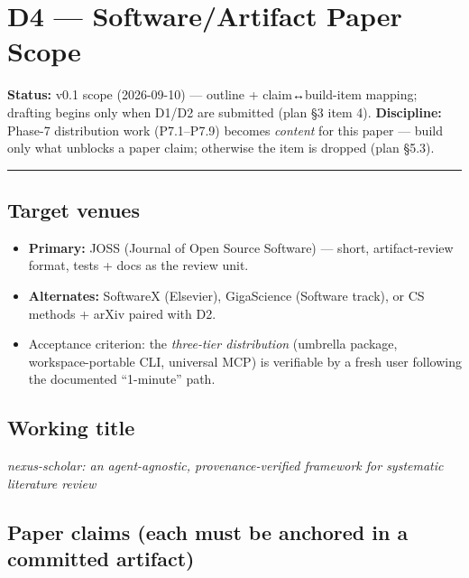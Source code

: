 \documentclass[11pt]{article}
\providecommand{\tightlist}{%
  \setlength{\itemsep}{0pt}\setlength{\parskip}{0pt}}
\begin{document}
\section{D4 --- Software/Artifact Paper
Scope}\label{d4-softwareartifact-paper-scope}

\textbf{Status:} v0.1 scope (2026-09-10) --- outline + claim↔build-item
mapping; drafting begins only when D1/D2 are submitted (plan §3 item 4).
\textbf{Discipline:} Phase-7 distribution work (P7.1--P7.9) becomes
\emph{content} for this paper --- build only what unblocks a paper
claim; otherwise the item is dropped (plan §5.3).

\begin{center}\rule{0.5\linewidth}{0.5pt}\end{center}

\subsection{Target venues}\label{target-venues}

\begin{itemize}
\tightlist
\item
  \textbf{Primary:} JOSS (Journal of Open Source Software) --- short,
  artifact-review format, tests + docs as the review unit.
\item
  \textbf{Alternates:} SoftwareX (Elsevier), GigaScience (Software
  track), or CS methods + arXiv paired with D2.
\item
  Acceptance criterion: the \emph{three-tier distribution} (umbrella
  package, workspace-portable CLI, universal MCP) is verifiable by a
  fresh user following the documented ``1-minute'' path.
\end{itemize}

\subsection{Working title}\label{working-title}

\emph{nexus-scholar: an agent-agnostic, provenance-verified framework
for systematic literature review}

\subsection{Paper claims (each must be anchored in a committed
artifact)}\label{paper-claims-each-must-be-anchored-in-a-committed-artifact}
\end{document}
